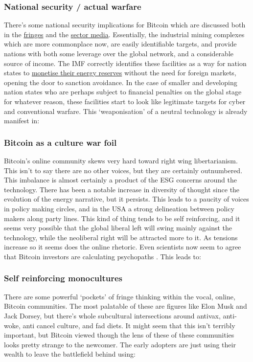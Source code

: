\subsubsection{National security / actual warfare}
There's some national security implications for Bitcoin which are discussed both in the \href{https://twitter.com/JasonPLowery/status/1512775981693648897?}{fringes} and the \href{https://www.coindesk.com/layer2/2022/04/04/why-bitcoin-mining-is-a-matter-of-national-security/}{sector media}. Essentially, the industrial mining complexes which are more commonplace now, are easily identifiable targets, and provide nations with both some leverage over the global network, and a considerable source of income. The IMF correctly identifies these facilities as a way for nation states to \href{https://www.imf.org/en/Publications/GFSR/Issues/2022/04/19/global-financial-stability-report-april-2022}{monetise their energy reserves} without the need for foreign markets, opening the door to sanction avoidance. In the case of smaller and developing nation states who are perhaps subject to financial penalties on the global stage for whatever reason, these facilities start to look like legitimate targets for cyber and conventional warfare. This `weaponisation' of a neutral technology is already manifest in:
\subsubsection{Bitcoin as a culture war foil}
Bitcoin's online community skews very hard toward right wing libertarianism. This isn't to say there are no other voices, but they are certainly outnumbered. This imbalance is almost certainly a product of the ESG concerns around the technology. There has been a notable increase in diversity of thought since the evolution of the energy narrative, but it persists. This leads to a paucity of voices in policy making circles, and in the USA a strong delineation between policy makers along party lines. This kind of thing tends to be self reinforcing, and it seems very possible that the global liberal left will swing mainly against the technology, while the neoliberal right will be attracted more to it. As tensions increase so it seems does the online rhetoric. Even scientists now seem to agree that Bitcoin investors are calculating psychopaths \cite{martin2022dark}. This leads to:
\subsubsection{Self reinforcing monocultures}
There are some powerful `pockets' of fringe thinking within the vocal, online, Bitcoin communities. The most palatable of these are figures like Elon Musk and Jack Dorsey, but there's whole subcultural intersections around antivax, anti-woke, anti cancel culture, and fad diets. It might seem that this isn't terribly important, but Bitcoin viewed though the lens of these of these communities looks pretty strange to the newcomer. The early adopters are just using their wealth to leave the battlefield behind using:
